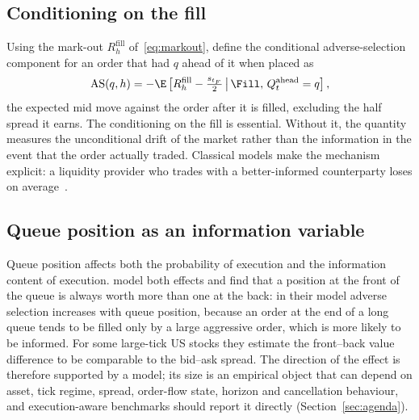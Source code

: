 \subsection{Conditioning on the fill}

Using the mark-out $R^{\text{fill}}_{h}$ of~\eqref{eq:markout}, define the conditional
adverse-selection component for an order that had $q$ ahead of it when placed as
\begin{equation}
  \mathrm{AS}(q, h) = -\E\left[R^{\text{fill}}_{h} - \tfrac{s_{t_F}}{2} \,\middle|\, \Fill,\, Q^{\text{ahead}}_t = q\right],
\end{equation}
the expected mid move against the order after it is filled, excluding the half spread it earns.
The conditioning on the fill is essential. Without it, the quantity measures the unconditional
drift of the market rather than the information in the event that the order actually traded.
Classical models make the mechanism explicit: a liquidity provider who trades with a better-informed
counterparty loses on average~\citep{glosten1985,kyle1985}.

\subsection{Queue position as an information variable}

Queue position affects both the probability of execution and the information content of
execution. \citet{moallemi2017} model both effects and find that a position at the front of the
queue is always worth more than one at the back: in their model adverse selection increases with queue
position, because an order at the end of a long queue tends to be filled only by a large aggressive
order, which is more likely to be informed. For some large-tick US stocks they estimate the front--back
value difference to be comparable to the bid--ask spread. The direction of the effect is therefore
supported by a model; its size is an empirical object that can depend on asset, tick regime,
spread, order-flow state, horizon and cancellation behaviour, and execution-aware benchmarks should
report it directly (Section~\ref{sec:agenda}).

